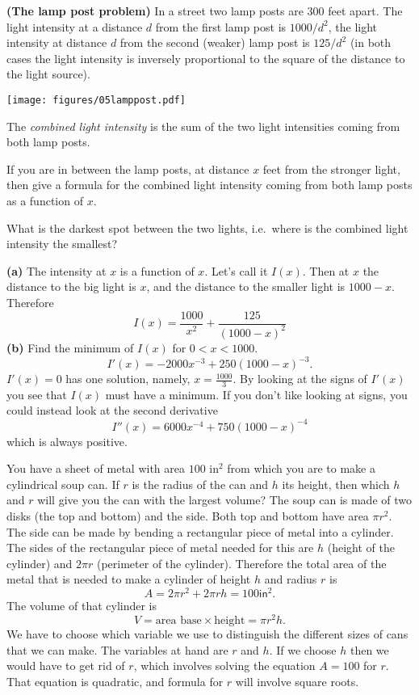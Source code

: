 \begin{multicols}{2}
\problem \groupproblem \textbf{(The lamp post problem)}
In a street two lamp posts are 300 feet apart.  The light intensity at
a distance $d$ from the first lamp post is $1000/d^2$, the light
intensity at distance $d$ from the second (weaker) lamp post is
$125/d^2$ (in both cases the light intensity is inversely proportional
to the square of the distance to the light source).  

\centerline{\texttt{[image: figures/05lamppost.pdf]}}

The \textit{combined light intensity} is the sum of the two light
intensities coming from both lamp posts.

\subprob If you are in between the lamp posts, at distance $x$
feet from the stronger light, then give a formula for the combined light
intensity coming from both lamp posts as a function of $x$.

\subprob What is the darkest spot between the two lights, i.e.\
where is the combined light intensity the smallest?

\answer
\textbf{(a)} The intensity at $x$ is a function of $x$.  Let's
call it $I(x)$.  Then at $x$ the distance to the big light is
$x$, and the distance to the smaller light is $1000-x$. Therefore
\[
  I(x) = \frac{1000}{x^2} + \frac{125}{(1000-x)^2}
\]
\textbf{(b)} Find the minimum of $I(x)$ for $0<x<1000$.
\[
  I'(x) = -2000 x^{-3} + 250(1000 - x)^{-3}.
\]
$I'(x) = 0$ has one solution, namely, $x= \frac{1000}{3}$.
By looking at the signs of $I'(x)$ you see that $I(x)$ must have a
minimum.  If you don't like looking at signs, you could instead
look at the second derivative
\[
  I''(x) = 6000 x^{-4} + 750 (1000 - x)^{-4}
\]
which is always positive.
\endanswer


\problem  %
\subprob You have a sheet of metal with area $100\text{ in}^2$
from which you are to make a cylindrical soup can.  If $r$ is the
radius of the can and $h$ its height, then which $h$ and $r$ will
give you the can with the largest volume?
\answer
The soup can is made of two disks (the top and bottom) and the side.
Both top and bottom have area $\pi r^2$.
The side can be made by bending a rectangular piece of metal into
a cylinder.  The sides of the rectangular piece of metal needed for
this are $h$ (height of the cylinder) and $2\pi r$ (perimeter of
the cylinder).  Therefore the total area of the metal that is needed
to make a cylinder of height $h$ and radius $r$ is
\[
A = 2\pi r^2 + 2\pi rh = 100 \mathsf{in}^2.
\]
The volume of that cylinder is
\[
V = \text{area base} \times \text{height} = \pi r^2h.
\]
We have to choose which variable we use to distinguish the different
sizes of cans that we can make.  The variables at hand are $r$
and $h$.  If we choose $h$ then we would have to get rid of $r$,
which involves solving the equation $A=100$ for $r$.  That equation
is quadratic, and formula for $r$ will involve square roots.


\end{multicols}
